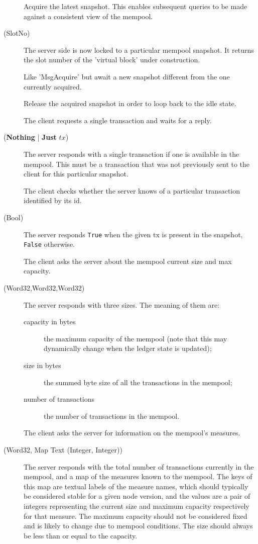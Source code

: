 \begin{description}
  \item[\MsgAcquire{}] Acquire the latest snapshot. This enables subsequent
    queries to be made against a consistent view of the mempool.
  \item[\MsgAcquired{} {\boldmath (SlotNo)}] The server side is now locked to
    a particular mempool snapshot. It returns the slot number of the 'virtual
    block' under construction.
  \item[\MsgAwaitAcquire{}] Like 'MsgAcquire' but await a new snapshot
    different from the one currently acquired.
  \item[\MsgRelease{}] Release the acquired snapshot in order to loop back to
    the idle state.
  \item[\MsgNextTx{}] The client requests a single transaction and waits for
    a reply.
  \item[\MsgReplyNextTx{} \boldmath(\textbf{Nothing} | \textbf{Just} $tx$)] The
    server responds with a single transaction if one is available in the
    mempool. This must be a transaction that was not previously sent to the
    client for this particular snapshot.
  \item[] The client checks whether the server knows of a particular
    transaction identified by its id.
  \item[\MsgReplyHasTx{} (Bool)] The server responds \texttt{True} when the given tx
    is present in the snapshot, \texttt{False} otherwise.
  \item[\MsgGetSizes{}] The client asks the server about the mempool current
    size and max capacity.
  \item[\MsgReplyGetSizes{} (Word32,Word32,Word32)] The server responds with
    three sizes.  The meaning of them are:
    \begin{description}
      \item[capacity in bytes] the maximum capacity of the mempool {\small (note that
        this may dynamically change when the ledger state is updated)};
      \item[size in bytes] the summed byte size of all the transactions in the
        mempool;
      \item[number of transactions] the number of transactions in the mempool.
    \end{description}
  \item[\MsgGetMeasures{}] The client asks the server for information on the mempool's measures.
  \item[\MsgReplyGetMeasures{} (Word32, Map Text (Integer, Integer))] The server responds with
    the total number of transactions currently in the mempool, and a map of the measures known to
    the mempool. The keys of this map are textual labels of the measure names, which should
    typically be considered stable for a given node version, and the values are a pair of integers
    representing the current size and maximum capacity respectively for that measure. The maximum
    capacity should not be considered fixed and is likely to change due to mempool conditions. The
    size should always be less than or equal to the capacity.
\end{description}

